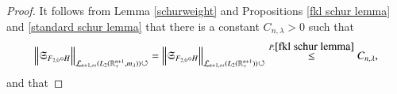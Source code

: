 \documentclass[12pt]{amsart}
\begin{document}
\begin{proof}
It follows from {\color{blue}Lemma \ref{schurweight}} and Propositions \ref{fkl schur lemma} and \ref{standard schur lemma} that there is a constant $C_{n,\lambda}>0$ such that
{\color{blue}\begin{align*}
\Big\|\mathfrak{S}_{F_{2,0}\circ H}\Big\|_{\mathcal{L}_{n+1,\infty}(L_2(\mathbb{R}^{n+1}_+,m_{\lambda}))\circlearrowleft}=\Big\|\mathfrak{S}_{F_{2,0}\circ H}\Big\|_{\mathcal{L}_{n+1,\infty}(L_2(\mathbb{R}^{n+1}_+))\circlearrowleft}\stackrel{P.\ref{fkl schur lemma}}{\leq}{C_{n,\lambda}},
\end{align*}}
and that

\end{proof}
\end{document}
